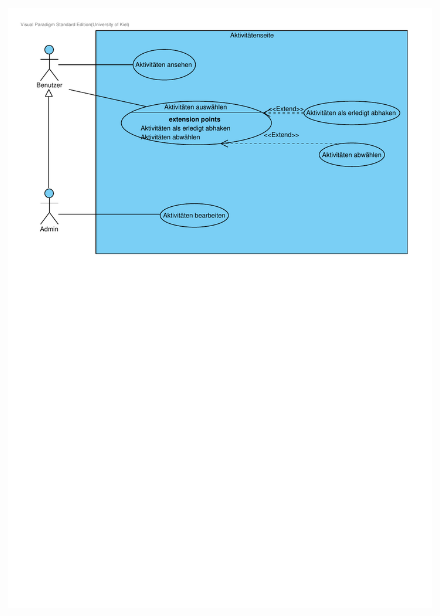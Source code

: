 \documentclass[10pt,a4paper]{article}
\begin{document}
	\begin{figure}[h!]
		\includegraphics[width=\linewidth]{gfx/webseite/Aktivitaetenseite.pdf}
	\end{figure}
\end{document}
